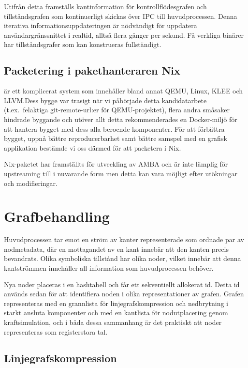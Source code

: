 Utifrån detta framställs kantinformation för kontrollflödesgrafen och
tillståndsgrafen som kontinuerligt skickas över IPC till huvudprocessen. Denna
iterativa informationsuppdateringen är nödvändigt för uppdatera
användargränssnittet i realtid, alltså flera gånger per sekund. Få verkliga
binärer har tillståndsgrafer som kan konstrueras fullständigt.

\subsection{Packetering i pakethanteraren Nix}

\stoe{} är ett komplicerat system som innehåller bland annat QEMU, Linux, KLEE
och LLVM.\@ Dess bygge var trasigt när vi påbörjade detta kandidatarbete (t.ex.\
felaktiga git-remote-url:er för QEMU-projektet), flera andra småsaker hindrade
byggande och utöver allt detta rekommenderades en Docker-miljö för att hantera
bygget med dess alla beroende komponenter. För att förbättra bygget, uppnå
bättre reproducerbarhet samt bättre samspel med en grafisk applikation bestämde
vi oss därmed för att packetera \stoe{} i Nix.

Nix-paketet \stoe{} har framställts för utveckling av AMBA och är inte lämplig
för upstreaming till \stoe{} i nuvarande form men detta kan vara möjligt efter
utökningar och modifieringar.

\section{Grafbehandling}

Huvudprocessen tar emot en ström av kanter representerade som ordnade par av
nodmetadata, där en mottagandet av en kant innebär att den kanten precis
bevandrats. Olika symboliska tillstånd har olika noder, vilket innebär att denna
kantströmmen innehåller all information som huvudprocessen behöver.

Nya noder placeras i en hashtabell och får ett sekventiellt allokerat id. Detta
id används sedan för att identifiera noden i olika representationer av grafen.
Grafen representeras med en grannlista för linjegrafskompression och nedbrytning
i starkt ansluta komponenter och med en kantlista för nodutplacering genom
kraftsimulation, och i båda dessa sammanhang är det praktiskt att noder
representeras som registerstora tal.

\subsection{Linjegrafskompression}


